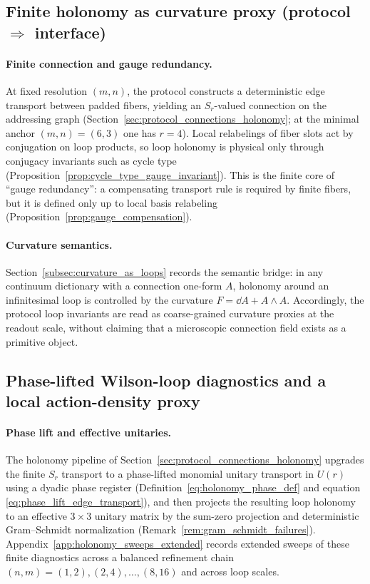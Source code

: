 \subsection{Finite holonomy as curvature proxy (protocol \texorpdfstring{$\Rightarrow$}{->} interface)}
\label{subsec:op3_holonomy_curvature_proxy}

\paragraph{Finite connection and gauge redundancy.}
At fixed resolution $(m,n)$, the protocol constructs a deterministic edge transport between padded fibers, yielding an $S_r$-valued connection on the addressing graph (Section~\ref{sec:protocol_connections_holonomy}; at the minimal anchor $(m,n)=(6,3)$ one has $r=4$).
Local relabelings of fiber slots act by conjugation on loop products, so loop holonomy is physical only through conjugacy invariants such as cycle type (Proposition~\ref{prop:cycle_type_gauge_invariant}).
This is the finite core of ``gauge redundancy'': a compensating transport rule is required by finite fibers, but it is defined only up to local basis relabeling (Proposition~\ref{prop:gauge_compensation}).

\paragraph{Curvature semantics.}
Section~\ref{subsec:curvature_as_loops} records the semantic bridge:
in any continuum dictionary with a connection one-form $A$, holonomy around an infinitesimal loop is controlled by the curvature $F=\dd A + A\wedge A$.
Accordingly, the protocol loop invariants are read as coarse-grained curvature proxies at the readout scale, without claiming that a microscopic connection field exists as a primitive object.

\subsection{Phase-lifted Wilson-loop diagnostics and a local action-density proxy}
\label{subsec:op3_wilson_loop_proxy}

\paragraph{Phase lift and effective unitaries.}
The holonomy pipeline of Section~\ref{sec:protocol_connections_holonomy} upgrades the finite $S_r$ transport to a phase-lifted monomial unitary transport in $U(r)$ using a dyadic phase register (Definition~\eqref{eq:holonomy_phase_def} and equation \eqref{eq:phase_lift_edge_transport}), and then projects the resulting loop holonomy to an effective $3\times 3$ unitary matrix by the sum-zero projection and deterministic Gram--Schmidt normalization (Remark~\ref{rem:gram_schmidt_failures}).
Appendix~\ref{app:holonomy_sweeps_extended} records extended sweeps of these finite diagnostics across a balanced refinement chain $(n,m)=(1,2),(2,4),\dots,(8,16)$ and across loop scales.


